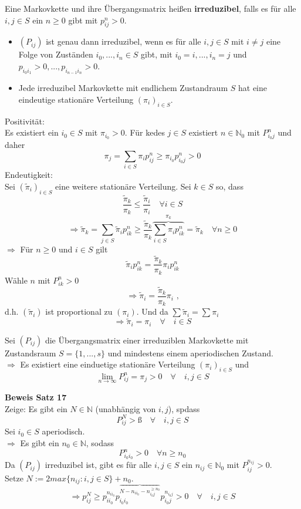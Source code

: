 \documentclass[a4paper,12pt]{article}
\begin{document}
Eine Markovkette und ihre Übergangsmatrix heißen \textbf{irreduzibel}, falls es für alle $i, j \in S$ ein $n \geq 0$ gibt
mit $p_{ij}^n>0$.
\begin{itemize}
	\item $(P_{ij})$ ist genau dann irreduzibel, wenn es für alle $i,j \in S$ mit $i \neq j$ eine Folge von Zuständen
	      $i_0, ..., i_n \in S$ gibt, mit $i_0 = i, ..., i_n = j$ und $p_{i_0i_1}>0, ..., p_{i_{n-1}i_n}> 0$.
	\item Jede irreduzibel Markovkette mit endlichem Zustandraum $S$ hat eine eindeutige stationäre Verteilung $(\pi_i)_{i \in S}$.
\end{itemize}
Positivität:\\
Es existiert ein $i_0 \in S$ mit $\pi_{i_0}>0$. Für kedes $j \in S$ existiert $n \in \mathbb{N}_0$ mit $P_{i_0j}^n$ und daher
$$
	\pi_j = \sum_{i \in S}\pi_ip_{ij}^n \geq \pi_{i_0}p_{i_0j}^n > 0
$$
Endeutigkeit:\\
Sei $(\tilde{\pi}_i)_{i \in S}$ eine weitere stationäre Verteilung.
Sei $k \in S$ so, dass$$
	\frac{\tilde{\pi}_k}{\pi_k} \leq \frac{\tilde{\pi}_i}{\pi_i} \quad \forall i \in S
$$
$$
	\Rightarrow \tilde{\pi}_k = \sum_{j \in S}\tilde{\pi}_ip_{ik}^n \geq \frac{\tilde{\pi}_k}{\pi_k} \overbrace{\sum_{i \in S}\pi_ip_{ik}^n}^{\pi_k} = \tilde{\pi}_k \quad \forall n \geq 0
$$
$\Rightarrow$ Für $n \geq 0$ und $i \in S$ gilt
$$
	\tilde{\pi}_ip_{ik}^n = \frac{\tilde{\pi}_k}{\pi_k}\pi_ip_{ik}^n
$$
Wähle $n$ mit $P_{ik}^n > 0$
$$
	\Rightarrow \tilde{\pi}_i = \frac{\tilde{\pi}_k}{\pi_k}\pi_i \text{ ,}
$$
d.h. $(\tilde{\pi}_i)$ ist proportional zu $(\pi_i)$.
Und da $\sum \tilde{\pi}_i = \sum \pi_i$
$$
	\Rightarrow \tilde{\pi}_i = \pi_i \quad \forall \quad i \in S
$$



\begin{tcolorbox}[breakable, colframe=green, colback=white, title=Satz 17]
	Sei $(P_{ij})$ die Übergangsmatrix einer irreduziblen Markovkette mit Zustandsraum
	$S = \{1,...,s\}$ und mindestens einem aperiodischen Zustand.\\
	$\Rightarrow$ Es existiert eine einduetige stationäre Verteilung $(\pi_i)_{i \in S}$ und
	$$
		\lim_{n \to \infty}P_{ij}^n = \pi_j > 0 \quad \forall \quad i,j \in S
	$$
\end{tcolorbox}

\textbf{Beweis Satz 17}\\
Zeige: Es gibt ein $N \in \mathbb{N}$ (unabhängig von $i,j$), spdass
$$
	P_{ij}^N > ß \quad \forall \quad i,j \in S
$$
Sei $i_0 \in S$ aperiodisch.\\
$\Rightarrow$ Es gibt ein $n_0 \in \mathbb{N}$, sodass
$$
	P_{i_0i_0}^n > 0 \quad \forall n \geq n_0
$$
Da $(P_{ij})$ irreduzibel ist, gibt es für alle $i,j \in S$ ein
$n_{ij}\in \mathbb{N}_0$ mit $P_{ij}^{n_{ij}}> 0$.\\
Setze $N:= 2max \{n_{ij}: i,j \in S\} + n_0$.
$$
	\Rightarrow p_{ij}^N \geq
	p_{ii_0}^{n_{ii_0}} p_{i_0i_0}^{    \overbrace{N - n_{ii_0} - n_{i_0j}^{\geq n_0}}}p_{i_0j}^{n_{i_0j}} > 0 \quad \forall \quad i,j \in S
$$
\end{document}
